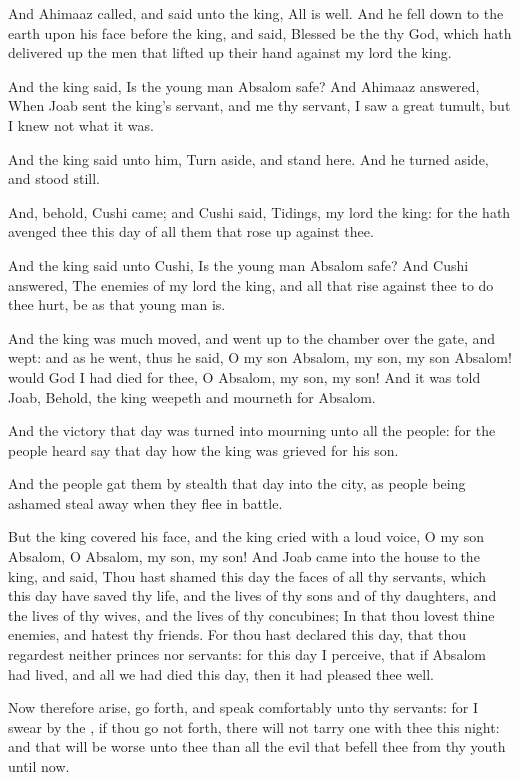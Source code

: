 \Verse And Ahimaaz called, and said unto the king, All is well. And he fell down to the earth upon his face before the king, and said, Blessed be the \LORD thy God, which hath delivered up the men that lifted up their hand against my lord the king.

\Verse And the king said, Is the young man Absalom safe? And Ahimaaz answered, When Joab sent the king's servant, and me thy servant, I saw a great tumult, but I knew not what it was.

\Verse And the king said unto him, Turn aside, and stand here. And he turned aside, and stood still.

\Verse And, behold, Cushi came; and Cushi said, Tidings, my lord the king: for the \LORD hath avenged thee this day of all them that rose up against thee.

\Verse And the king said unto Cushi, Is the young man Absalom safe? And Cushi answered, The enemies of my lord the king, and all that rise against thee to do thee hurt, be as that young man is.

\Verse And the king was much moved, and went up to the chamber over the gate, and wept: and as he went, thus he said, O my son Absalom, my son, my son Absalom! would God I had died for thee, O Absalom, my son, my son!  
\Chapter
\Verse And it was told Joab, Behold, the king weepeth and mourneth for Absalom.

\Verse And the victory that day was turned into mourning unto all the people: for the people heard say that day how the king was grieved for his son.

\Verse And the people gat them by stealth that day into the city, as people being ashamed steal away when they flee in battle.

\Verse But the king covered his face, and the king cried with a loud voice, O my son Absalom, O Absalom, my son, my son!  \Verse And Joab came into the house to the king, and said, Thou hast shamed this day the faces of all thy servants, which this day have saved thy life, and the lives of thy sons and of thy daughters, and the lives of thy wives, and the lives of thy concubines; \Verse In that thou lovest thine enemies, and hatest thy friends. For thou hast declared this day, that thou regardest neither princes nor servants: for this day I perceive, that if Absalom had lived, and all we had died this day, then it had pleased thee well.

\Verse Now therefore arise, go forth, and speak comfortably unto thy servants: for I swear by the \LORD, if thou go not forth, there will not tarry one with thee this night: and that will be worse unto thee than all the evil that befell thee from thy youth until now.

